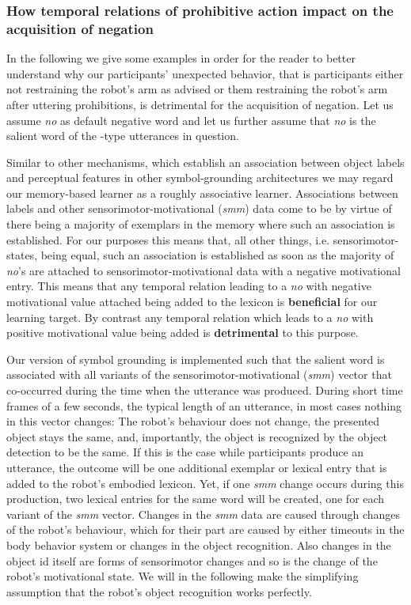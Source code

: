\subsubsection{How temporal relations of prohibitive action impact on the acquisition of negation}\hfill \break
In the following we give some examples in order for the reader to better understand why our participants' unexpected behavior, that is participants
either not restraining the robot's arm as advised or them restraining the robot's arm after uttering prohibitions, is detrimental for the acquisition of
negation.
Let us assume \emph{no} as default negative word and let us further assume that \emph{no} is the salient word of the -type utterances
in question.

Similar to other mechanisms, which establish an association between object labels and perceptual features in other symbol-grounding architectures we may regard our
memory-based learner as a roughly associative learner. Associations between labels and other sensorimotor-motivational (\emph{smm}) data come to be by virtue of there
being a majority of exemplars in the memory where such an association is established. For our purposes this means that, all other things, i.e. sensorimotor-states,
being equal, such an association is established as soon as the majority of \emph{no}'s are attached to sensorimotor-motivational data with a negative motivational
entry. This means that any temporal relation leading to a \emph{no} with negative motivational value attached being added to the lexicon is \textbf{beneficial}
for our learning target. By contrast any temporal relation which leads to a \emph{no} with positive motivational value being added is \textbf{detrimental} to
this purpose.

Our version of symbol grounding is implemented such that the salient word is associated with all variants of the sensorimotor-motivational (\emph{smm}) 
vector that co-occurred during the time when the utterance was produced. During short time frames of a few seconds, the typical length of an utterance, 
in most cases nothing in this vector changes: The robot's behaviour does not change, the presented object stays the same, and, importantly, 
the object is recognized by the object detection to be the same. If this is the case while participants produce an utterance, the outcome will be one 
additional exemplar or lexical entry that is added to the robot's embodied lexicon. Yet, if one \emph{smm} change occurs during this production, two 
lexical entries for the same word will be created, one for each variant of the \emph{smm} vector.
Changes  in the \emph{smm} data are caused through changes of the robot's behaviour, which for their part are caused by either timeouts in the body behavior
system or changes in the object recognition. Also changes in the object id itself are forms of sensorimotor changes and so is the change of the robot's
motivational state. We will in the following make the simplifying assumption that the robot's object recognition works perfectly.

